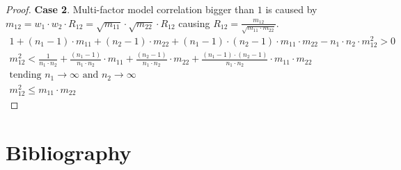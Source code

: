 \documentclass[11pt,fleqn]{book} %
\begin{document}
\begin{proof}
	\textbf{Case 2}. Multi-factor model correlation bigger than $1$ is caused
	by $m_{12} = w_1 \cdot w_2 \cdot R_{12} = \sqrt{m_{11}} \cdot \sqrt{m_{22}} \cdot R_{12}$
	causing $R_{12} = \frac{m_{12}}{\sqrt{m_{11} \cdot m_{22}}}$.
	\begin{displaymath}
		\begin{array}{l}
			1 + (n_1-1) \cdot m_{11} + (n_2-1) \cdot m_{22} +                     
			(n_1-1) \cdot (n_2-1) \cdot m_{11} \cdot m_{22} -                     
			n_1 \cdot n_2 \cdot m_{12}^2 > 0                                      
			                                                                      \\
			m_{12}^2 <                                                            
			\frac{1}{n_1 \cdot n_2} +                                             
			\frac{(n_1-1)}{n_1 \cdot n_2} \cdot m_{11} +                          
			\frac{(n_2-1)}{n_1 \cdot n_2} \cdot m_{22} +                          
			\frac{(n_1-1) \cdot (n_2-1)}{n_1 \cdot n_2} \cdot m_{11} \cdot m_{22} 
			                                                                      \\
			\text{tending } n_1 \to \infty \text{ and } n_2 \to \infty            
			                                                                      \\
			m_{12}^2 \le m_{11} \cdot m_{22}                                      
		\end{array}
	\end{displaymath}
\end{proof}


\chapter*{Bibliography}
\end{document}
